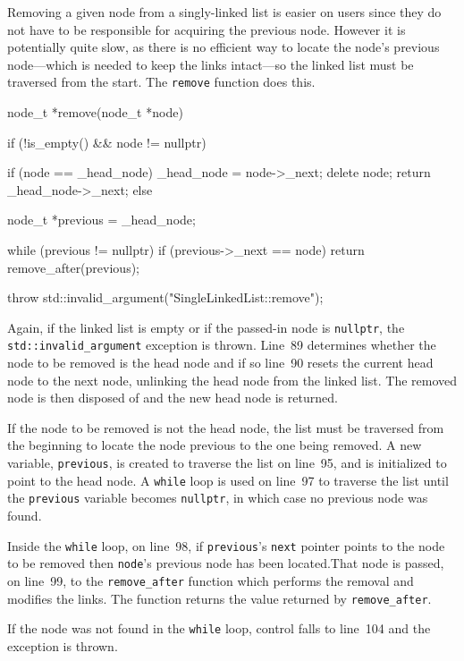 \documentclass{article}
\begin{document}
  Removing a given node from a singly-linked list is easier on users since they do not have to be responsible for acquiring the previous node. However it is potentially quite slow, as there is no efficient way to locate the node's previous node---which is needed to keep the links intact---so the linked list must be traversed from the start. The \verb|remove| function does this.
  \begin{lstcpp}
  node_t *remove(node_t *node) {
    if (!is_empty() && node != nullptr) {
      if (node == _head_node) {
        _head_node = node->_next;
        delete node;
        return _head_node->_next;
      }
      else {
        node_t *previous = _head_node;

        while (previous != nullptr) {
          if (previous->_next == node)
            return remove_after(previous);
        }
      }
    }

    throw std::invalid_argument("SingleLinkedList::remove");
  }\end{lstcpp}
  Again, if the linked list is empty or if the passed-in node is \verb|nullptr|, the \verb|std::invalid_argument| exception is thrown. Line~89 determines whether the node to be removed is the head node and if so line~90 resets the current head node to the next node, unlinking the head node from the linked list. The removed node is then disposed of and the new head node is returned.

  If the node to be removed is not the head node, the list must be traversed from the beginning to locate the node previous to the one being removed. A new variable, \verb|previous|, is created to traverse the list on line~95, and is initialized to point to the head node. A \verb|while| loop is used on line~97 to traverse the list until the \verb|previous| variable becomes \verb|nullptr|, in which case no previous node was found.

  Inside the \verb|while| loop, on line~98, if \verb|previous|'s \verb|next| pointer points to the node to be removed then \verb|node|'s previous node has been located.That node is passed, on line~99, to the \verb|remove_after| function which performs the removal and modifies the links. The function returns the value returned by \verb|remove_after|.

  If the node was not found in the \verb|while| loop, control falls to line~104 and the exception is thrown.
\end{document}
